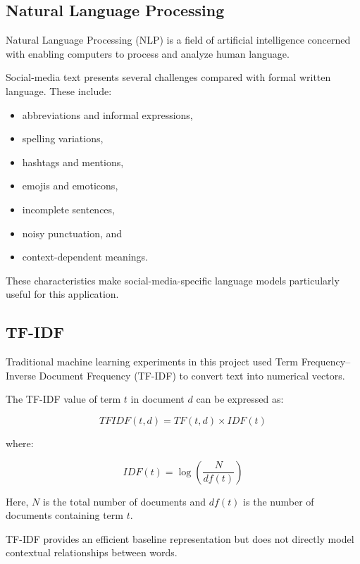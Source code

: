 \documentclass[12pt,a4paper]{article}
\begin{document}
\subsection{Natural Language Processing}

Natural Language Processing (NLP) is a field of artificial intelligence
concerned with enabling computers to process and analyze human language.

Social-media text presents several challenges compared with formal written
language. These include:

\begin{itemize}
    \item abbreviations and informal expressions,
    \item spelling variations,
    \item hashtags and mentions,
    \item emojis and emoticons,
    \item incomplete sentences,
    \item noisy punctuation, and
    \item context-dependent meanings.
\end{itemize}

These characteristics make social-media-specific language models particularly
useful for this application.

\subsection{TF-IDF}

Traditional machine learning experiments in this project used Term
Frequency--Inverse Document Frequency (TF-IDF) to convert text into numerical
vectors.

The TF-IDF value of term $t$ in document $d$ can be expressed as:

\begin{equation}
TFIDF(t,d) = TF(t,d) \times IDF(t)
\end{equation}

where:

\begin{equation}
IDF(t) = \log\left(\frac{N}{df(t)}\right)
\end{equation}

Here, $N$ is the total number of documents and $df(t)$ is the number of
documents containing term $t$.

TF-IDF provides an efficient baseline representation but does not directly
model contextual relationships between words.
\end{document}
